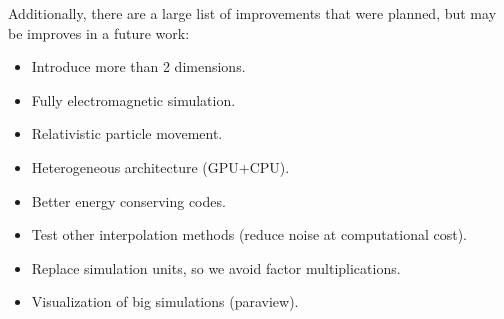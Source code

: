 Additionally, there are a large list of improvements that were planned, but may 
be improves in a future work:

\begin{itemize}
\item Introduce more than 2 dimensions.
\item Fully electromagnetic simulation.
\item Relativistic particle movement.
\item Heterogeneous architecture (GPU+CPU).
\item Better energy conserving codes.
\item Test other interpolation methods (reduce noise at computational cost).
\item Replace simulation units, so we avoid factor multiplications.
\item Visualization of big simulations (paraview).
\end{itemize}
